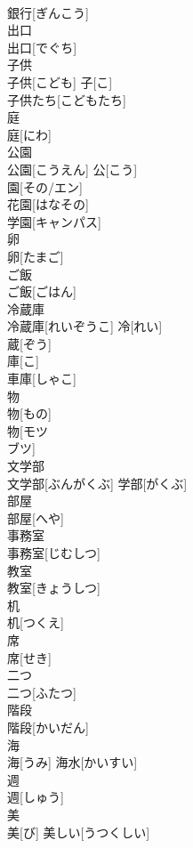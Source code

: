\documentclass[8pt]{extreport}
\begin{document}
\begin{CJK}{UTF8}{min}
\\	銀行[ぎんこう]	
\\	出口	
\\	出口[でぐち]	
\\	子供	
\\	子供[こども]	子[こ] 
\\	子供たち[こどもたち] 
\\	庭	
\\	庭[にわ]	
\\	公園	
\\	公園[こうえん]	公[こう] 
\\	園[その/エン] 
\\	花園[はなその] 
\\	学園[キャンパス] 
\\	卵	
\\	卵[たまご]	
\\	ご飯	
\\	ご飯[ごはん]	
\\	冷蔵庫	
\\	冷蔵庫[れいぞうこ]	冷[れい] 
\\	蔵[ぞう] 
\\	庫[こ] 
\\	車庫[しゃこ] 
\\	物	
\\	物[もの] 
\\	物[モツ 
\\	ブツ]	
\\	文学部	
\\	文学部[ぶんがくぶ]	学部[がくぶ] 
\\	部屋	
\\	部屋[へや]	
\\	事務室	
\\	事務室[じむしつ]	
\\	教室	
\\	教室[きょうしつ]	
\\	机	
\\	机[つくえ]	
\\	席	
\\	席[せき]	
\\	二つ	
\\	二つ[ふたつ]	
\\	階段	
\\	階段[かいだん]	
\\	海	
\\	海[うみ]	海水[かいすい] 
\\	週	
\\	週[しゅう]	
\\	美	
\\	美[び]	美しい[うつくしい] 

\end{CJK}
\end{document}
